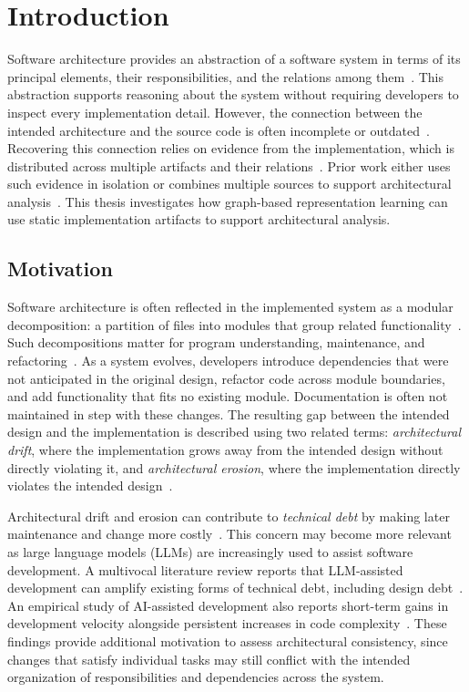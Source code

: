 \chapter{Introduction \label{ch:introduction}}
\chaptertoc

Software architecture provides an abstraction of a software system in terms of its principal elements, their responsibilities, and the relations among them~\cite{clements2003}. This abstraction supports reasoning about the system without requiring developers to inspect every implementation detail. However, the connection between the intended architecture and the source code is often incomplete or outdated~\cite{ali2018architecture,de2012controlling}. Recovering this connection relies on evidence from the implementation, which is distributed across multiple artifacts and their relations~\cite{negar,nsga3}. Prior work either uses such evidence in isolation or combines multiple sources to support architectural analysis~\cite{sarif,zbr,negar}. This thesis investigates how graph-based representation learning can use static implementation artifacts to support architectural analysis.

\section{Motivation}
\label{sec:intro-motivation}

Software architecture is often reflected in the implemented system as a modular decomposition: a partition of files into modules that group related functionality~\cite{parnas1972}. Such decompositions matter for program understanding, maintenance, and refactoring~\cite{clements2003}. As a system evolves, developers introduce dependencies that were not anticipated in the original design, refactor code across module boundaries, and add functionality that fits no existing module. Documentation is often not maintained in step with these changes. The resulting gap between the intended design and the implementation is described using two related terms: \emph{architectural drift}, where the implementation grows away from the intended design without directly violating it, and \emph{architectural erosion}, where the implementation directly violates the intended design~\cite{de2012controlling}.

Architectural drift and erosion can contribute to \emph{technical debt} by making later maintenance and change more costly~\cite{kruchten2012technicaldebt}. This concern may become more relevant as large language models (LLMs) are increasingly used to assist software development. A multivocal literature review reports that LLM-assisted development can amplify existing forms of technical debt, including design debt~\cite{ehsani2025fastercode}. An empirical study of AI-assisted development also reports short-term gains in development velocity alongside persistent increases in code complexity~\cite{he2026speed}. These findings provide additional motivation to assess architectural consistency, since changes that satisfy individual tasks may still conflict with the intended organization of responsibilities and dependencies across the system.

